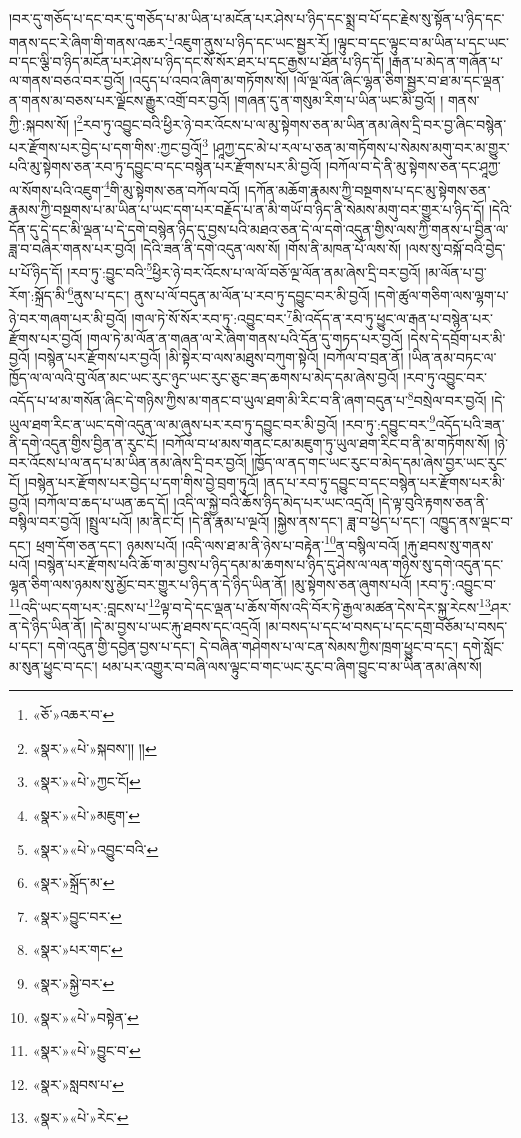 །བར་དུ་གཅོད་པ་དང་བར་དུ་གཅོད་པ་མ་ཡིན་པ་མངོན་པར་ཤེས་པ་ཉིད་དང་སྨྲ་བ་པོ་དང་རྗེས་སུ་སྟོན་པ་ཉིད་དང་གནས་དང་རེ་ཞིག་གི་གནས་འཆར་\footnote{«ཅོ་»འཆར་བ་}འཇུག་ནུས་པ་ཉིད་དང་ཡང་སྦྱར་རོ། །ལྟུང་བ་དང་ལྟུང་བ་མ་ཡིན་པ་དང་ཡང་བ་དང་ལྕི་བ་ཉིད་མངོན་པར་ཤེས་པ་ཉིད་དང་སོ་སོར་ཐར་པ་དང་རྒྱས་པ་ཐོན་པ་ཉིད་དོ། །རྒན་པ་མེད་ན་གཞོན་པ་ལ་གནས་བཅའ་བར་བྱའོ། །འདུད་པ་འབའ་ཞིག་མ་གཏོགས་སོ། །ལོ་ལྔ་ལོན་ཞིང་ལྷན་ཅིག་སྦྱར་བ་ཐ་མ་དང་ལྡན་ན་གནས་མ་བཅས་པར་ལྗོངས་རྒྱུར་འགྲོ་བར་བྱའོ། །གཞན་དུ་ན་གསུམ་རིག་པ་ཡིན་ཡང་མི་བྱའོ། །
གནས་ཀྱི་:སྐབས་སོ། །\footnote{«སྣར་»«པེ་»སྐབས་།། །།}རབ་ཏུ་འབྱུང་བའི་ཕྱིར་ཉེ་བར་འོངས་པ་ལ་མུ་སྟེགས་ཅན་མ་ཡིན་ནམ་ཞེས་དྲི་བར་བྱ་ཞིང་བསྙེན་པར་རྫོགས་པར་བྱེད་པ་དག་གིས་:ཀྱང་བྱའོ།\footnote{«སྣར་»«པེ་»ཀྱང་ངོ།} །ཤཱཀྱ་དང་མེ་པ་རལ་པ་ཅན་མ་གཏོགས་པ་སེམས་མགུ་བར་མ་གྱུར་པའི་མུ་སྟེགས་ཅན་རབ་ཏུ་དབྱུང་བ་དང་བསྙེན་པར་རྫོགས་པར་མི་བྱའོ། །བཀོལ་བ་དེ་ནི་མུ་སྟེགས་ཅན་དང་ཤཱཀྱ་ལ་སོགས་པའི་འཇུག་\footnote{«སྣར་»«པེ་»མཇུག་}གི་མུ་སྟེགས་ཅན་བཀོལ་བའོ། །དཀོན་མཆོག་རྣམས་ཀྱི་བསྔགས་པ་དང་མུ་སྟེགས་ཅན་རྣམས་ཀྱི་བསྔགས་པ་མ་ཡིན་པ་ཡང་དག་པར་བརྗོད་པ་ན་མི་གཡོ་བ་ཉིད་ནི་སེམས་མགུ་བར་གྱུར་པ་ཉིད་དོ། །དེའི་དོན་དུ་དེ་དང་མི་ལྡན་པ་དེ་དགེ་བསྙེན་ཉིད་དུ་བྱས་པའི་མཐའ་ཅན་དེ་ལ་དགེ་འདུན་གྱིས་ལས་ཀྱི་གནས་པ་བྱིན་ལ་ཟླ་བ་བཞིར་གནས་པར་བྱའོ། །དེའི་ཟན་ནི་དགེ་འདུན་ལས་སོ། །གོས་ནི་མཁན་པོ་ལས་སོ། །ལས་སུ་བསྐོ་བའི་བྱེད་པ་པོ་ཉིད་དོ། །རབ་ཏུ་:བྱུང་བའི་\footnote{«སྣར་»«པེ་»འབྱུང་བའི་}ཕྱིར་ཉེ་བར་འོངས་པ་ལ་ལོ་བཅོ་ལྔ་ལོན་ནམ་ཞེས་དྲི་བར་བྱའོ། །མ་ལོན་པ་བྱ་རོག་:སྐྲོད་མི་\footnote{«སྣར་»སྐྲོད་མ་}ནུས་པ་དང་། ནུས་པ་ལོ་བདུན་མ་ལོན་པ་རབ་ཏུ་དབྱུང་བར་མི་བྱའོ། །དགེ་ཚུལ་གཅིག་ལས་ལྷག་པ་ཉེ་བར་གཞག་པར་མི་བྱའོ། །གལ་ཏེ་སོ་སོར་རབ་ཏུ་:འབྱུང་བར་\footnote{«སྣར་»བྱུང་བར་}མི་འདོད་ན་རབ་ཏུ་ཕྱུང་ལ་རྒན་པ་བསྙེན་པར་རྫོགས་པར་བྱའོ། །གལ་ཏེ་མ་ལོན་ན་གཞན་ལ་རེ་ཞིག་གནས་པའི་དོན་དུ་གཏད་པར་བྱའོ། །དེས་དེ་དབྲོག་པར་མི་བྱའོ། །བསྙེན་པར་རྫོགས་པར་བྱའོ། །མི་སྟེར་བ་ལས་མཐུས་བཀུག་སྟེའོ། །བཀོལ་བ་བྲན་ནོ། །ཡིན་ནམ་བཏང་ལ་ཁྱོད་ལ་ལ་ལའི་བུ་ལོན་མང་ཡང་རུང་ཉུང་ཡང་རུང་ཅུང་ཟད་ཆགས་པ་མེད་དམ་ཞེས་བྱའོ། །རབ་ཏུ་འབྱུང་བར་འདོད་པ་ཕ་མ་གསོན་ཞིང་དེ་གཉིས་ཀྱིས་མ་གནང་བ་ཡུལ་ཐག་མི་རིང་བ་ནི་ཞག་བདུན་པ་\footnote{«སྣར་»པར་གང་}བསྲེལ་བར་བྱའོ། །དེ་ཡུལ་ཐག་རིང་ན་ཡང་དགེ་འདུན་ལ་མ་ཞུས་པར་རབ་ཏུ་དབྱུང་བར་མི་བྱའོ། །རབ་ཏུ་:དབྱུང་བར་\footnote{«སྣར་»སྐྱེ་བར་}འདོད་པའི་ཟན་ནི་དགེ་འདུན་གྱིས་བྱིན་ན་རུང་ངོ། །བཀོལ་བ་ཕ་མས་གནང་ངམ་མཇུག་ཏུ་ཡུལ་ཐག་རིང་བ་ནི་མ་གཏོགས་སོ། །ཉེ་བར་འོངས་པ་ལ་ནད་པ་མ་ཡིན་ནམ་ཞེས་དྲི་བར་བྱའོ། །ཁྱོད་ལ་ནད་གང་ཡང་རུང་བ་མེད་དམ་ཞེས་བྱར་ཡང་རུང་ངོ། །བསྙེན་པར་རྫོགས་པར་བྱེད་པ་དག་གིས་བྱེ་བྲག་ཏུའོ། །ནད་པ་རབ་ཏུ་དབྱུང་བ་དང་བསྙེན་པར་རྫོགས་པར་མི་བྱའོ། །བཀོལ་བ་ཆད་པ་ཡན་ཆད་དོ། །འདི་ལ་སྐྱེ་བའི་ཆོས་ཉིད་མེད་པར་ཡང་འདྲའོ། །དེ་ལྟ་བུའི་རྟགས་ཅན་ནི་བསྙིལ་བར་བྱའོ། །སྤྲུལ་པའོ། །མ་ནིང་ངོ། །དེ་ནི་རྣམ་པ་ལྔའོ། །སྐྱེས་ནས་དང་། ཟླ་བ་ཕྱེད་པ་དང་། འཁྱུད་ནས་ལྡང་བ་དང་། ཕྲག་དོག་ཅན་དང་། ཉམས་པའོ། །འདི་ལས་ཐ་མ་ནི་ཉེས་པ་བརྟེན་\footnote{«སྣར་»«པེ་»བསྟེན་}ན་བསྙིལ་བའོ། །རྐུ་ཐབས་སུ་གནས་པའོ། །བསྙེན་པར་རྫོགས་པའི་ཆོ་ག་མ་བྱས་པ་ཉིད་དམ་མ་ཆགས་པ་ཉིད་དུ་ཤེས་ལ་ལན་གཉིས་སུ་དགེ་འདུན་དང་ལྷན་ཅིག་ལས་ཉམས་སུ་མྱོང་བར་གྱུར་པ་ཉིད་ན་དེ་ཉིད་ཡིན་ནོ། །མུ་སྟེགས་ཅན་ཞུགས་པའོ། །རབ་ཏུ་:འབྱུང་བ་\footnote{«སྣར་»«པེ་»བྱུང་བ་}འདི་ཡང་དག་པར་:བླངས་པ་\footnote{«སྣར་»སླབས་པ་}ལྟ་བ་དེ་དང་ལྡན་པ་ཆོས་གོས་འདི་བོར་ཏེ་རྒྱལ་མཚན་དེས་དེར་སྐྱ་རེངས་\footnote{«སྣར་»«པེ་»རེང་}ཤར་ན་དེ་ཉིད་ཡིན་ནོ། །དེ་མ་བྱས་པ་ཡང་རྐུ་ཐབས་དང་འདྲའོ། །མ་བསད་པ་དང་ཕ་བསད་པ་དང་དགྲ་བཅོམ་པ་བསད་པ་དང་། དགེ་འདུན་གྱི་དབྱེན་བྱས་པ་དང་། དེ་བཞིན་གཤེགས་པ་ལ་ངན་སེམས་ཀྱིས་ཁྲག་ཕྱུང་བ་དང་། དགེ་སློང་མ་སུན་ཕྱུང་བ་དང་། ཕམ་པར་འགྱུར་བ་བཞི་ལས་ལྟུང་བ་གང་ཡང་རུང་བ་ཞིག་བྱུང་བ་མ་ཡིན་ནམ་ཞེས་སོ། 